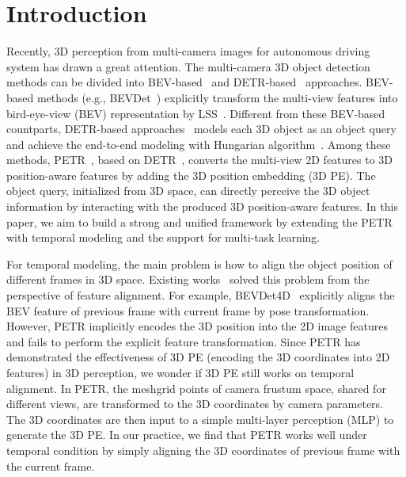 \documentclass[10pt,twocolumn,letterpaper]{article}
\begin{document}
\section{Introduction}
Recently, 3D perception from multi-camera images for autonomous driving system has drawn a great attention. The multi-camera 3D object detection methods can be divided into BEV-based~\cite{huang2021bevdet, huang2022bevdet4d} and DETR-based~\cite{wang2022detr3d, liu2022petr, li2022bevformer} approaches. 
BEV-based methods (e.g., BEVDet~\cite{huang2021bevdet}) explicitly transform the multi-view features into bird-eye-view (BEV) representation by LSS~\cite{philion2020lift}. Different from these BEV-based countparts, DETR-based approaches~\cite{wang2022detr3d} models each 3D object as an object query and achieve the end-to-end modeling with Hungarian algorithm~\cite{kuhn1955hungarian}. 
Among these methods, PETR~\cite{liu2022petr}, based on DETR~\cite{carion2020detr}, converts the multi-view 2D features to 3D position-aware features by adding the 3D position embedding (3D PE). The object query, initialized from 3D space, can directly perceive the 3D object information by interacting with the produced 3D position-aware features. In this paper, we aim to build a strong and unified framework by extending the PETR with temporal modeling and the support for multi-task learning.

For temporal modeling, the main problem is how to align the object position of different frames in 3D space. Existing works~\cite{huang2022bevdet4d, li2022bevformer} solved this problem from the perspective of feature alignment. For example, BEVDet4D~\cite{huang2022bevdet4d} explicitly aligns the BEV feature of previous frame with current frame by pose transformation. However, PETR implicitly encodes the 3D position into the 2D image features and fails to perform the explicit feature transformation.
Since PETR has demonstrated the effectiveness of 3D PE (encoding the 3D coordinates into 2D features) in 3D perception, we wonder if 3D PE still works on temporal alignment. 
In PETR, the meshgrid points of camera frustum space, shared for different views, are transformed to the 3D coordinates by camera parameters. The 3D coordinates are then input to a simple multi-layer perception (MLP) to generate the 3D PE. 
In our practice, we find that PETR works well under temporal condition by simply aligning the 3D coordinates of previous frame with the current frame.
\end{document}
